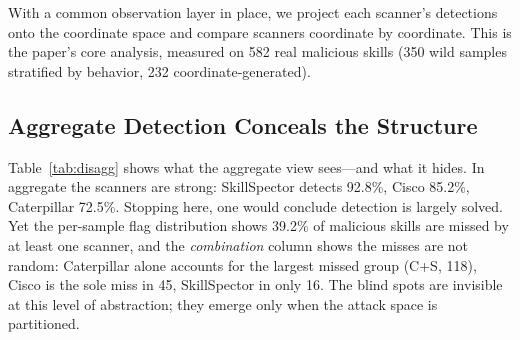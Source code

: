 \documentclass[sigconf,nonacm]{acmart}
\begin{document}
With a common observation layer in place, we project each scanner's detections onto the coordinate space and compare scanners coordinate by coordinate. This is the paper's core analysis, measured on 582 real malicious skills (350 wild samples stratified by behavior, 232 coordinate-generated).

\subsection{Aggregate Detection Conceals the Structure}
Table~\ref{tab:disagg} shows what the aggregate view sees---and what it hides. In aggregate the scanners are strong: SkillSpector detects 92.8\%, Cisco 85.2\%, Caterpillar 72.5\%. Stopping here, one would conclude detection is largely solved. Yet the per-sample flag distribution shows 39.2\% of malicious skills are missed by at least one scanner, and the \emph{combination} column shows the misses are not random: Caterpillar alone accounts for the largest missed group (C+S, 118), Cisco is the sole miss in 45, SkillSpector in only 16. The blind spots are invisible at this level of abstraction; they emerge only when the attack space is partitioned.
\end{document}
